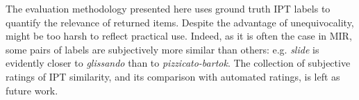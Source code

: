 \documentclass{article}
\makeatletter
\newcommand*{\eg}{e.g.\@\xspace}
\makeatother
\begin{document}
The evaluation methodology presented here uses ground truth IPT labels to quantify the relevance of returned items.
Despite the advantage of unequivocality, might be too harsh to reflect practical use.
Indeed, as it is often the case in MIR, some pairs of labels are subjectively more similar than others: \eg{} \emph{slide} is evidently closer to \emph{glissando} than to \emph{pizzicato-bartok}.
The collection of subjective ratings of IPT similarity, and its comparison with automated ratings, is left as future work.








\end{document}
